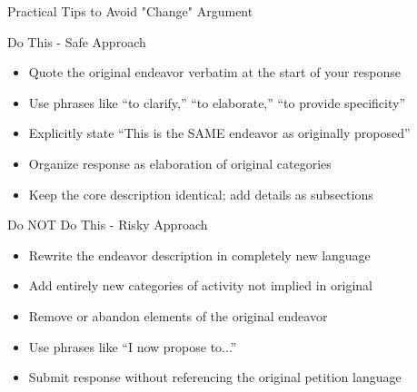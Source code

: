 \documentclass[11pt]{beamer}
\begin{document}
	\begin{frame}{Practical Tips to Avoid "Change" Argument}
		\scriptsize
		\begin{block}{Do This - Safe Approach}
			\begin{itemize}
				\item [$\checkmark$] Quote the original endeavor verbatim at the start of your response
				\item [$\checkmark$] Use phrases like ``to clarify,'' ``to elaborate,'' ``to provide specificity''
				\item [$\checkmark$] Explicitly state ``This is the SAME endeavor as originally proposed''
				\item [$\checkmark$] Organize response as elaboration of original categories
				\item [$\checkmark$] Keep the core description identical; add details as subsections
			\end{itemize}
		\end{block}
		\begin{block}{Do NOT Do This - Risky Approach}
			\begin{itemize}
				\item [$\times$] Rewrite the endeavor description in completely new language
				\item [$\times$] Add entirely new categories of activity not implied in original
				\item [$\times$] Remove or abandon elements of the original endeavor
				\item [$\times$] Use phrases like ``I now propose to...''
				\item [$\times$] Submit response without referencing the original petition language
			\end{itemize}
		\end{block}
	\end{frame}
	
\end{document}
